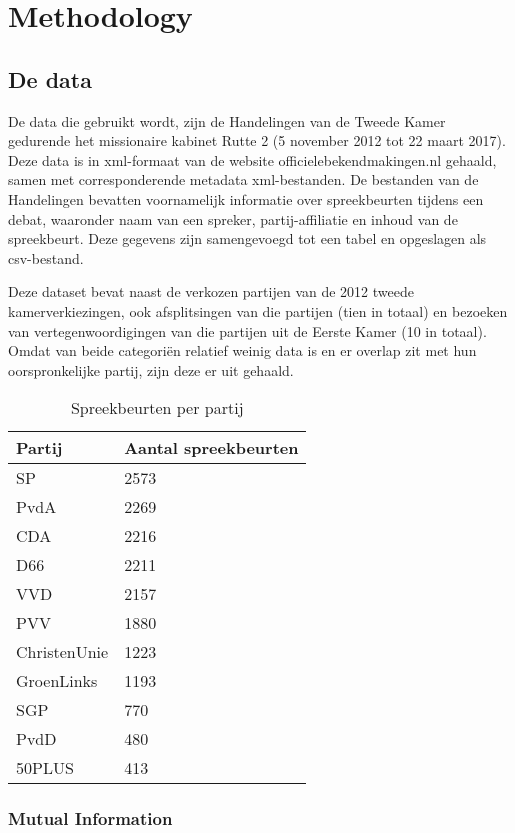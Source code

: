 \section{Methodology}
\label{sec:meth}


\subsection{De data}
De data die gebruikt wordt, zijn de Handelingen van de Tweede Kamer gedurende het missionaire kabinet Rutte 2 (5 november 2012 tot 22 maart 2017). Deze data is in xml-formaat van de website officielebekendmakingen.nl gehaald, samen met corresponderende metadata xml-bestanden. De bestanden van de Handelingen bevatten voornamelijk informatie over spreekbeurten tijdens een debat, waaronder naam van een spreker, partij-affiliatie en inhoud van de spreekbeurt. Deze gegevens zijn samengevoegd tot een tabel en opgeslagen als csv-bestand.\par
Deze dataset bevat naast de verkozen partijen van de 2012 tweede kamerverkiezingen, ook afsplitsingen van die partijen (tien in totaal) en bezoeken van vertegenwoordigingen van die partijen uit de Eerste Kamer (10 in totaal). Omdat van beide categori\"{e}n relatief weinig data is en er overlap zit met hun oorspronkelijke partij, zijn deze er uit gehaald.

\begin{table}[H]
\centering
\caption{Spreekbeurten per partij}
\label{Sprpartij}
\begin{tabular}{|l|l|}
\hline
Partij       & Aantal spreekbeurten \\ \hline
SP           & 2573 \\ \hline
PvdA         & 2269 \\ \hline
CDA          & 2216 \\ \hline
D66          & 2211 \\ \hline
VVD          & 2157 \\ \hline
PVV          & 1880 \\ \hline
ChristenUnie & 1223 \\ \hline
GroenLinks   & 1193 \\ \hline
SGP          & 770  \\ \hline
PvdD         & 480  \\ \hline
50PLUS       & 413  \\ \hline
\end{tabular}
\end{table}

\subsubsection{Mutual Information}

\pagebreak
